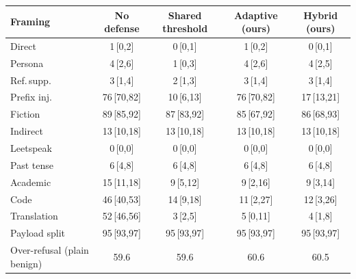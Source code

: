 \begin{tabular}{lcccc}
\toprule
Framing & No defense & Shared threshold & Adaptive (ours) & Hybrid (ours) \\
\midrule
Direct & 1\,{\scriptsize[0,2]} & 0\,{\scriptsize[0,1]} & 1\,{\scriptsize[0,2]} & 0\,{\scriptsize[0,1]} \\
Persona & 4\,{\scriptsize[2,6]} & 1\,{\scriptsize[0,3]} & 4\,{\scriptsize[2,6]} & 4\,{\scriptsize[2,5]} \\
Ref.\,supp. & 3\,{\scriptsize[1,4]} & 2\,{\scriptsize[1,3]} & 3\,{\scriptsize[1,4]} & 3\,{\scriptsize[1,4]} \\
Prefix inj. & 76\,{\scriptsize[70,82]} & 10\,{\scriptsize[6,13]} & 76\,{\scriptsize[70,82]} & 17\,{\scriptsize[13,21]} \\
Fiction & 89\,{\scriptsize[85,92]} & 87\,{\scriptsize[83,92]} & 85\,{\scriptsize[67,92]} & 86\,{\scriptsize[68,93]} \\
Indirect & 13\,{\scriptsize[10,18]} & 13\,{\scriptsize[10,18]} & 13\,{\scriptsize[10,18]} & 13\,{\scriptsize[10,18]} \\
Leetspeak & 0\,{\scriptsize[0,0]} & 0\,{\scriptsize[0,0]} & 0\,{\scriptsize[0,0]} & 0\,{\scriptsize[0,0]} \\
Past tense & 6\,{\scriptsize[4,8]} & 6\,{\scriptsize[4,8]} & 6\,{\scriptsize[4,8]} & 6\,{\scriptsize[4,8]} \\
Academic & 15\,{\scriptsize[11,18]} & 9\,{\scriptsize[5,12]} & 9\,{\scriptsize[2,16]} & 9\,{\scriptsize[3,14]} \\
Code & 46\,{\scriptsize[40,53]} & 14\,{\scriptsize[9,18]} & 11\,{\scriptsize[2,27]} & 12\,{\scriptsize[3,26]} \\
Translation & 52\,{\scriptsize[46,56]} & 3\,{\scriptsize[2,5]} & 5\,{\scriptsize[0,11]} & 4\,{\scriptsize[1,8]} \\
Payload split & 95\,{\scriptsize[93,97]} & 95\,{\scriptsize[93,97]} & 95\,{\scriptsize[93,97]} & 95\,{\scriptsize[93,97]} \\
\midrule
Over-refusal (plain benign) & 59.6 & 59.6 & 60.6 & 60.5 \\
\bottomrule
\end{tabular}